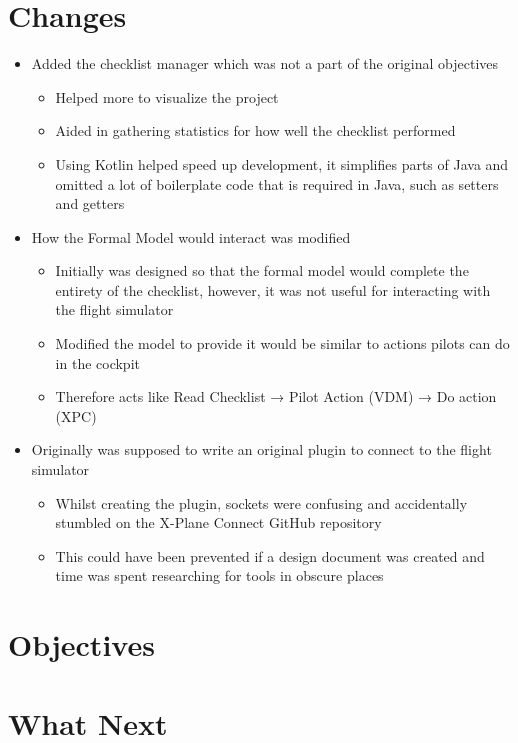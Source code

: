\documentclass[../dissertation.tex]{subfiles}
\begin{document}
\section{Changes}
\begin{itemize}
  \item Added the checklist manager which was not a part of the original
    objectives
  \begin{itemize}
    \item Helped more to visualize the project
    \item Aided in gathering statistics for how well the checklist performed
    \item Using Kotlin helped speed up development, it simplifies parts
      of Java and omitted a lot of boilerplate code that is required in Java,
      such as setters and getters
  \end{itemize}
  \item How the Formal Model would interact was modified
  \begin{itemize}
    \item Initially was designed so that the formal model would complete
      the entirety of the checklist, however, it was not useful for interacting
      with the flight simulator
    \item Modified the model to provide it would be similar to actions pilots can
      do in the cockpit
    \item Therefore acts like Read Checklist → Pilot Action (VDM) → Do action (XPC)
  \end{itemize}
  \item Originally was supposed to write an original plugin to connect to the flight simulator
  \begin{itemize}
    \item Whilst creating the plugin, sockets were confusing and accidentally stumbled
      on the X-Plane Connect GitHub repository
    \item This could have been prevented if a design document was created and
      time was spent researching for tools in obscure places
  \end{itemize}
\end{itemize}

\section{Objectives}


\section{What Next}
\end{document}
